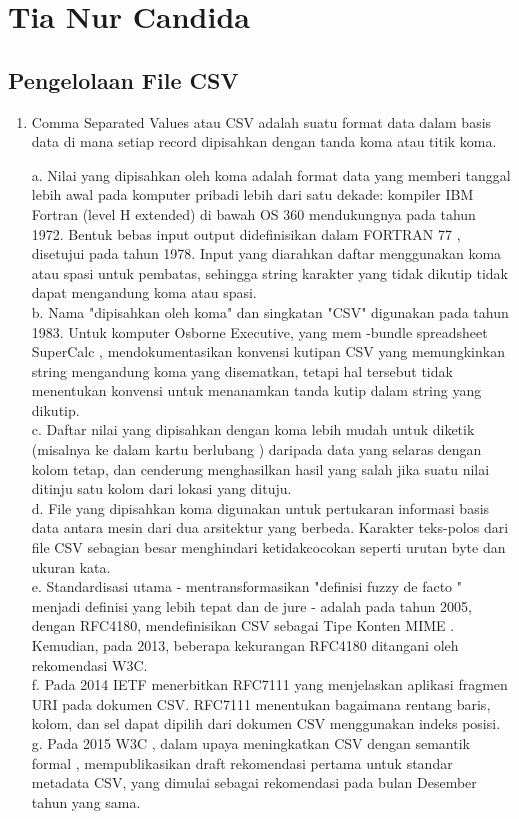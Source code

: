\section{Tia Nur Candida }
\subsection{Pengelolaan File CSV}
\begin{enumerate}
\item
Comma Separated Values atau CSV adalah suatu format data dalam basis data di mana setiap record dipisahkan dengan tanda koma atau titik koma.

a.	Nilai yang dipisahkan oleh koma adalah format data yang memberi tanggal lebih awal pada komputer pribadi lebih dari satu dekade: kompiler IBM Fortran (level H extended) di bawah OS  360 mendukungnya pada tahun 1972. Bentuk bebas input output didefinisikan dalam FORTRAN 77 , disetujui pada tahun 1978. 
Input yang diarahkan daftar menggunakan koma atau spasi untuk pembatas, sehingga string karakter yang tidak dikutip tidak dapat mengandung koma atau spasi.\\
b.	Nama "dipisahkan oleh koma" dan singkatan "CSV" digunakan pada tahun 1983. Untuk komputer Osborne Executive, yang mem -bundle spreadsheet SuperCalc , mendokumentasikan konvensi kutipan CSV yang memungkinkan string mengandung koma yang disematkan, tetapi hal tersebut tidak menentukan konvensi untuk menanamkan tanda kutip dalam string yang dikutip.\\
c.	Daftar nilai yang dipisahkan dengan koma lebih mudah untuk diketik (misalnya ke dalam kartu berlubang ) daripada data yang selaras dengan kolom tetap, dan cenderung menghasilkan hasil yang salah jika suatu nilai ditinju satu kolom dari lokasi yang dituju.\\
d.	File yang dipisahkan koma digunakan untuk pertukaran informasi basis data antara mesin dari dua arsitektur yang berbeda. Karakter teks-polos dari file CSV sebagian besar menghindari ketidakcocokan seperti urutan byte dan ukuran kata.\\
e.	Standardisasi utama - mentransformasikan "definisi fuzzy de facto " menjadi definisi yang lebih tepat dan de jure - adalah pada tahun 2005, dengan RFC4180, mendefinisikan CSV sebagai Tipe Konten MIME . Kemudian, pada 2013, beberapa kekurangan RFC4180 ditangani oleh rekomendasi W3C.\\
f.	Pada 2014 IETF menerbitkan RFC7111 yang menjelaskan aplikasi fragmen URI pada dokumen CSV. RFC7111 menentukan bagaimana rentang baris, kolom, dan sel dapat dipilih dari dokumen CSV menggunakan indeks posisi.\\
g.	Pada 2015 W3C , dalam upaya meningkatkan CSV dengan semantik formal , mempublikasikan draft rekomendasi pertama untuk standar metadata CSV, yang dimulai sebagai rekomendasi pada bulan Desember tahun yang sama.\\


\end{enumerate}
